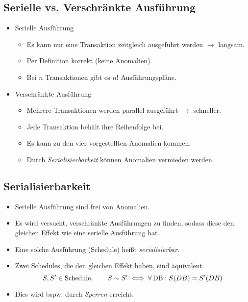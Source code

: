         \subsection{Serielle vs. Verschränkte Ausführung} %
            \begin{itemize}
            	\item Serielle Ausführung
            		\begin{itemize}
            			\item Es kann nur eine Transaktion zeitgleich ausgeführt werden \( \rightarrow \) langsam.
            			\item Per Definition korrekt (keine Anomalien).
            			\item Bei \(n\) Transaktionen gibt es \(n!\) Ausführungspläne.
            		\end{itemize}
            	\item Verschränkte Ausführung
            		\begin{itemize}
            			\item Mehrere Transaktionen werden parallel ausgeführt \( \rightarrow \) schneller.
            			\item Jede Transaktion behält ihre Reihenfolge bei.
            			\item Es kann zu den vier vorgestellten Anomalien kommen.
            			\item Durch \textit{Serialisierbarkeit} können Anomalien vermieden werden.
            		\end{itemize}
            \end{itemize}

        \subsection{Serialisierbarkeit} %
            \begin{itemize}
            	\item Serielle Ausführung sind frei von Anomalien.
            	\item Es wird versucht, verschränkte Ausführungen zu finden, sodass diese den gleichen Effekt wie eine serielle Ausführung hat.
            	\item Eine solche Ausführung (Schedule) heißt \textit{serialisierbar}.
            	\item Zwei Schedules, die den gleichen Effekt haben, sind äquivalent.
            		\begin{equation*}
                		S, S' \in \text{Schedule}, \quad\quad S \sim S' \iff \forall \operatorname{DB} : S(DB) = S'(DB)
            		\end{equation*}
            	\item Dies wird bspw. durch \textit{Sperren} erreicht.
            \end{itemize}

